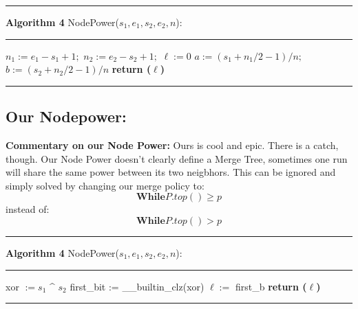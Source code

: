 \documentclass{article}
\begin{document}
\noindent\rule{\linewidth}{0.8pt}\par
\vspace{-0.3em} 
\noindent\textbf{Algorithm 4} NodePower($s_1,e_1,s_2,e_2,n$):\label{alg:nodepower1}

\vspace{-0.6em} 
\noindent\rule{\linewidth}{0.5pt}\par 
\vspace{-0.5em} 
\begin{algorithmic}[1]
\State $n_1 := e_1 - s_1 + 1;$ \text{ } $n_2 := e_2 - s_2 + 1;$ \text{ } $\ell := 0$
\State $a := (s_1 + n_1/2 - 1)/n;$ \text{ } $b := (s_2 + n_2/2 - 1)/n$
\EndWhile   
\State \textbf{return ($\ell$)}
\end{algorithmic}
\vspace{-1em} 
\noindent\rule{\linewidth}{0.5pt}\par 

\subsection{Our Nodepower:}
\textbf{Commentary on our Node Power:} Ours is cool and epic.
There is a catch, though. Our Node Power doesn't clearly define a 
Merge Tree, sometimes one run will share the same power 
between its two neigbhors. This can be ignored and simply solved by changing
our merge policy to:
\begin{equation}
\textbf{While} {P.top() \geq p}
\end{equation}
instead of:
\begin{equation}
\textbf{While} {P.top() > p}
\end{equation}

\noindent\rule{\linewidth}{0.8pt}\par 
\vspace{-0.3em} 
\noindent\textbf{Algorithm 4} NodePower($s_1,e_1,s_2,e_2,n$):\label{alg:nodepower2}

\vspace{-0.6em} 
\noindent\rule{\linewidth}{0.5pt}\par 
\vspace{-0.5em} 
\begin{algorithmic}[1]
\State xor $:= s_1$ \textbf{\^{}} $s_2$
\State first\_{}bit := \_{\_{}}builtin\_{}clz(xor)
\State $\ell :=$ first\_{}b
\State \textbf{return ($\ell$)}
\end{algorithmic}
\vspace{-1em}
\noindent\rule{\linewidth}{0.5pt}\par
\newpage
\end{document}
